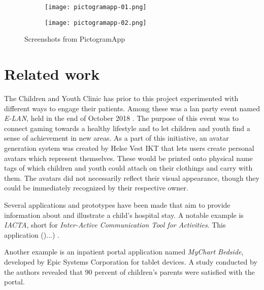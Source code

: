 \begin{figure}
    \centering
    \begin{subfigure}{0.3\textwidth}
        \centering
        \texttt{[image: pictogramapp-01.png]}
        \label{fig:pictogramapp-list}
    \end{subfigure}
    \hspace{0.05\textwidth}
    \begin{subfigure}{0.3\textwidth}
        \centering
        \texttt{[image: pictogramapp-02.png]}
        \label{fig:pictogramapp-scene}
    \end{subfigure}
    \caption{Screenshots from PictogramApp}
    \label{fig:pictogramapp}
\end{figure}

\section{Related work}
\label{sec:relatedwork}

The Children and Youth Clinic has prior to this project experimented with different ways to engage their patients. Among these was a lan party event named \emph{E-LAN}, held in the end of October 2018 \parencite{helsebergen2018}. The purpose of this event was to connect gaming towards a healthy lifestyle and to let children and youth find a sense of achievement in new areas. As a part of this initiative, an avatar generation system was created by Helse Vest IKT that lets users create personal avatars which represent themselves. These would be printed onto physical name tags of which children and youth could attach on their clothings and carry with them. The avatars did not necessarily reflect their visual appearance, though they could be immediately recognized by their respective owner.

Several applications and prototypes have been made that aim to provide information about and illustrate a child's hospital stay. A notable example is \emph{IACTA}, short for \emph{Inter-Active Communication Tool for Activities}. This application ()...) \parencite{stalberg2018}.

Another example is an inpatient portal application named \emph{MyChart Bedside}, developed by Epic Systems Corporation for tablet devices. A study conducted by the authors \textcite{kelly2017} revealed that 90 percent of children's parents were satisfied with the portal.


